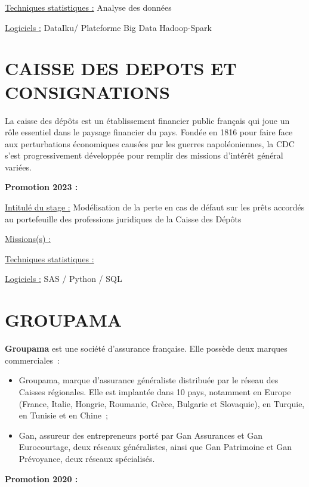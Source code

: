 \documentclass[
  letterpaper,
  DIV=11,
  numbers=noendperiod]{scrreprt}
\begin{document}
\uline{Techniques statistiques :} Analyse des données

\uline{Logiciels :} DataIku/ Plateforme Big Data Hadoop-Spark

\hypertarget{caisse-des-depots-et-consignations}{%
\section{\texorpdfstring{\textbf{CAISSE DES DEPOTS ET
CONSIGNATIONS}}{CAISSE DES DEPOTS ET CONSIGNATIONS}}\label{caisse-des-depots-et-consignations}}

La caisse des dépôts est un établissement financier public français qui
joue un rôle essentiel dans le paysage financier du pays. Fondée en 1816
pour faire face aux perturbations économiques causées par les guerres
napoléoniennes, la CDC s'est progressivement développée pour remplir des
missions d'intérêt général variées.

\textbf{Promotion 2023 :}

\uline{Intitulé du stage :} Modélisation de la perte en cas de défaut
sur les prêts accordés au portefeuille des professions juridiques de la
Caisse des Dépôts

\uline{Missions(s) :}

\uline{Techniques statistiques :}

\uline{Logiciels :} SAS / Python / SQL

\hypertarget{groupama}{%
\section{\texorpdfstring{\textbf{GROUPAMA}}{GROUPAMA}}\label{groupama}}

\textbf{Groupama} est une société d'assurance française. Elle possède
deux marques commerciales~:

\begin{itemize}
\item
  Groupama, marque d'assurance généraliste distribuée par le réseau des
  Caisses régionales. Elle est implantée dans 10 pays, notamment en
  Europe (France, Italie, Hongrie, Roumanie, Grèce, Bulgarie et
  Slovaquie), en Turquie, en Tunisie et en Chine~;
\item
  Gan, assureur des entrepreneurs porté par Gan Assurances et Gan
  Eurocourtage, deux réseaux généralistes, ainsi que Gan Patrimoine et
  Gan Prévoyance, deux réseaux spécialisés.
\end{itemize}

\textbf{Promotion 2020 :}
\end{document}
